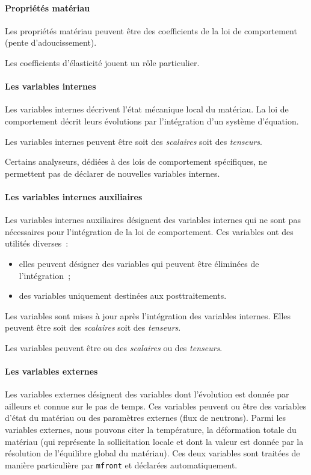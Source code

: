 \documentclass[rectoverso,pleiades,pstricks,leqno,anti]{texmf/note_technique_2010}
\newcommand{\mfront}{\texttt{mfront}}
\begin{document}
\paragraph{Propriétés matériau} Les propriétés matériau peuvent être des
coefficients de la loi de comportement (pente d'adoucissement).

Les coefficients d'élasticité jouent un rôle particulier.

\paragraph{Les variables internes} Les variables internes décrivent
l'état mécanique local du matériau. La loi de comportement décrit leurs
évolutions par l'intégration d'un système d'équation.

Les variables internes peuvent être soit des {\em scalaires} soit des
{\em tenseurs}.

Certains analyseurs, dédiées à des lois de comportement spécifiques,
ne permettent pas de déclarer de nouvelles variables internes.

\paragraph{Les variables internes auxiliaires} Les variables internes
auxiliaires désignent des variables internes qui ne sont pas nécessaires
pour l'intégration de la loi de comportement. Ces variables ont des
utilités diverses~:
\begin{itemize}
  \item elles peuvent désigner des variables qui peuvent être éliminées
  de l'intégration~;
  \item des variables uniquement destinées aux posttraitements.
\end{itemize}

Les variables sont mises à jour après l'intégration des variables
internes. Elles peuvent être soit des {\em scalaires} soit des {\em
  tenseurs}.

Les variables peuvent être ou des {\em scalaires} ou des {\em tenseurs}.

\paragraph{Les variables externes} Les variables externes désignent
des variables dont l'évolution est donnée par ailleurs et connue sur
le pas de temps. Ces variables peuvent ou être des variables d'état du
matériau ou des paramètres externes (flux de neutrons). Parmi les
variables externes, nous pouvons citer la température, la déformation
totale du matériau (qui représente la sollicitation locale et dont la
valeur est donnée par la résolution de l'équilibre global du
matériau). Ces deux variables sont traitées de manière particulière
par \mfront{} et déclarées automatiquement.
\end{document}
